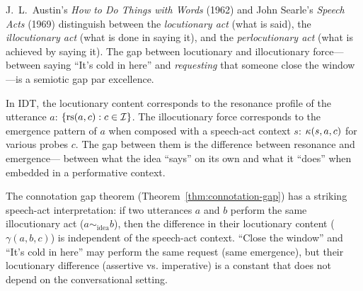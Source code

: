 \begin{interpretation}\label{interp:ch6:austin_speech_acts}
J.~L.~Austin's \emph{How to Do Things with Words} (1962) and John Searle's
\emph{Speech Acts} (1969) distinguish between the \emph{locutionary act}
(what is said), the \emph{illocutionary act} (what is done in saying it),
and the \emph{perlocutionary act} (what is achieved by saying it). The gap
between locutionary and illocutionary force---between saying ``It's cold in
here'' and \emph{requesting} that someone close the window---is a semiotic
gap par excellence.

In IDT, the locutionary content corresponds to the resonance profile of
the utterance $a$: $\{\mathrm{rs}(a, c) : c \in \mathcal{I}\}$. The illocutionary force
corresponds to the emergence pattern of $a$ when composed with a
speech-act context $s$: $\kappa(s, a, c)$ for various probes $c$. The
gap between them is the difference between resonance and emergence---
between what the idea ``says'' on its own and what it ``does'' when
embedded in a performative context.

The connotation gap theorem (Theorem~\ref{thm:connotation-gap}) has a
striking speech-act interpretation: if two utterances $a$ and $b$ perform
the same illocutionary act ($a \sim_{\text{idea}} b$), then the difference
in their locutionary content ($\gamma(a, b, c)$) is independent of the
speech-act context. ``Close the window'' and ``It's cold in here'' may
perform the same request (same emergence), but their locutionary
difference (assertive vs. imperative) is a constant that does not depend
on the conversational setting.
\end{interpretation}

